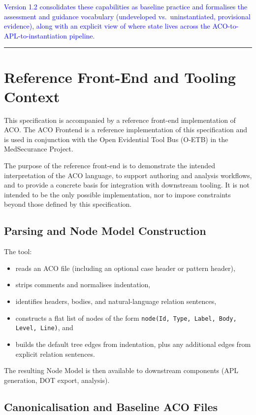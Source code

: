 \documentclass[11pt]{article}
\begin{document}
\textcolor{blue}{Version 1.2 consolidates these capabilities as baseline practice and formalises the assessment and guidance vocabulary (undeveloped vs.\ uninstantiated, provisional evidence), along with an explicit view of where state lives across the ACO-to-APL-to-instantiation pipeline.}

\bigskip
\hrule
\bigskip

\section{Reference Front-End and Tooling Context}
\label{sec:frontend}

This specification is accompanied by a reference front-end implementation of ACO.
The ACO Frontend is a reference implementation of this specification and is used in
conjunction with the Open Evidential Tool Bus (O-ETB) in the MedSecurance Project.

The purpose of the reference front-end is to demonstrate the intended interpretation
of the ACO language, to support authoring and analysis workflows, and to provide a
concrete basis for integration with downstream tooling. It is not intended to be the
only possible implementation, nor to impose constraints beyond those defined by this
specification.

\subsection*{Parsing and Node Model Construction}

The tool:
\begin{itemize}[leftmargin=2em]
  \item reads an ACO file (including an optional case header or pattern header),
  \item strips comments and normalises indentation,
  \item identifies headers, bodies, and natural-language relation sentences,
  \item constructs a flat list of nodes of the form
    \texttt{node(Id, Type, Label, Body, Level, Line)}, and
  \item builds the default tree edges from indentation, plus any additional edges from explicit relation sentences.
\end{itemize}

The resulting Node Model is then available to downstream components (APL generation, DOT export, analysis).

\subsection*{Canonicalisation and Baseline ACO Files}
\end{document}
